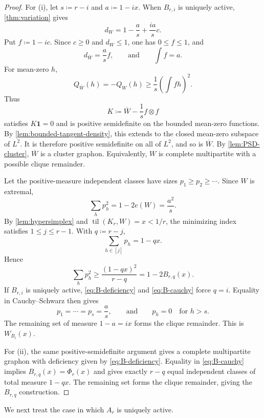\documentclass[10pt]{article}
\numberwithin{equation}{section}
\newcommand{\til}{\operatorname{til}}
\newcommand{\one}{\mathbf 1}
\begin{document}
\begin{proof}
For \textup{(i)}, let $s\coloneqq r-i$ and $a\coloneqq1-ix$.  When $B_{r,i}$ is uniquely active, \cref{thm:variation} gives
\begin{equation}\label{eq:Bdegree}
 d_W=1-\frac{a}{s}+\frac{ia}{s}c.
\end{equation}
Put $f\coloneqq1-ic$.  Since $c\ge0$ and $d_W\le1$, one has $0\le f\le1$, and
\[
 d_{\overline W}=\frac{a}{s}f,
 \qquad\text{and}\qquad
 \int f=a.
\]
For mean-zero $h$,
\[
 Q_{\overline W}(h)=-Q_W(h)
 \ge\frac1s\left(\int fh\right)^2.
\]
Thus
\[
 K\coloneqq\overline W-\frac1s f\otimes f
\]
satisfies $K\one=0$ and is positive semidefinite on the bounded mean-zero functions.  By \cref{lem:bounded-tangent-density}, this extends to the closed mean-zero subspace of $L^2$.  It is therefore positive semidefinite on all of $L^2$, and so is $\overline W$.  By \cref{lem:PSD-cluster}, $\overline W$ is a cluster graphon.  Equivalently, $W$ is complete multipartite with a possible clique remainder.

Let the positive-measure independent classes have sizes $p_1\ge p_2\ge\cdots$.  Since $W$ is extremal,
\begin{equation}\label{eq:B-deficiency}
 \sum_hp_h^2=1-2e(W)=\frac{a^2}{s}.
\end{equation}
By \cref{lem:hypersimplex} and $\til(K_r,W)=x<1/r$, the minimizing index satisfies $1\le j\le r-1$.  With $q\coloneqq r-j$,
\[
 \sum_{h\in[j]}p_h=1-qx.
\]
Hence
\begin{equation}\label{eq:B-cauchy}
 \sum_hp_h^2\ge\frac{(1-qx)^2}{r-q}=1-2B_{r,q}(x).
\end{equation}
If $B_{r,i}$ is uniquely active, \cref{eq:B-deficiency} and \cref{eq:B-cauchy} force $q=i$.  Equality in Cauchy--Schwarz then gives
\[
 p_1=\cdots=p_s=\frac{a}{s},
 \qquad\text{and}\qquad
 p_h=0\quad\text{for }h>s.
\]
The remaining set of measure $1-a=ix$ forms the clique remainder.  This is $W_{B_i}(x)$.

For \textup{(ii)}, the same positive-semidefinite argument gives a complete multipartite graphon with deficiency given by \cref{eq:B-deficiency}.  Equality in \cref{eq:B-cauchy} implies $B_{r,q}(x)=\Phi_r(x)$ and gives exactly $r-q$ equal independent classes of total measure $1-qx$.  The remaining set forms the clique remainder, giving the $B_{r,q}$ construction.
\end{proof}

We next treat the case in which $A_r$ is uniquely active.
\end{document}
